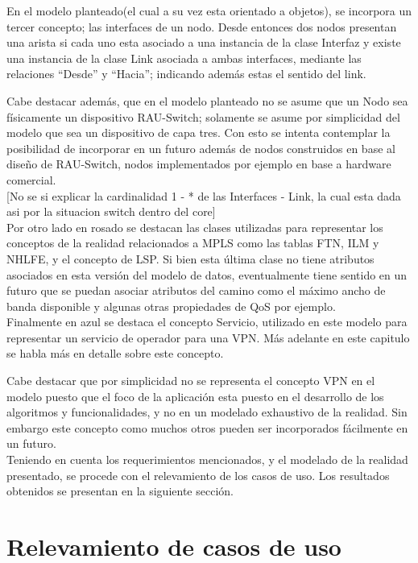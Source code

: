 En el modelo planteado(el cual a su vez esta orientado a objetos), se incorpora un tercer concepto;  las interfaces de un nodo. Desde entonces dos nodos presentan una arista si cada uno esta asociado a una instancia de la clase Interfaz y existe una instancia de la clase Link asociada a ambas interfaces, mediante las relaciones “Desde” y “Hacia”; indicando adem\'as estas el sentido del link.

Cabe destacar adem\'as, que en el modelo planteado no se asume que un Nodo sea f\'isicamente un dispositivo RAU-Switch; solamente se asume por simplicidad del modelo que sea un dispositivo de capa tres. Con esto se intenta contemplar la posibilidad de incorporar en un futuro adem\'as de nodos construidos en base al diseño de RAU-Switch, nodos implementados por ejemplo en base a hardware comercial.\\
  
[No se si explicar la cardinalidad 1 - * de las Interfaces - Link, la cual esta dada asi por la situacion switch dentro del core]\\

Por otro lado en rosado se destacan las clases utilizadas para representar los conceptos de la realidad relacionados a MPLS como las tablas FTN, ILM y NHLFE, y el concepto de LSP. Si bien esta \'ultima clase no tiene atributos asociados en esta versi\'on del modelo de datos, eventualmente tiene sentido en un futuro que se puedan asociar atributos del camino como el m\'aximo ancho de banda disponible y algunas otras propiedades de QoS por ejemplo.\\

Finalmente en azul se destaca el concepto Servicio, utilizado en este modelo para representar un servicio de operador para una VPN. M\'as adelante en este capitulo se habla m\'as en detalle sobre este concepto.

Cabe destacar que por simplicidad no se representa el concepto VPN en el modelo puesto que el foco de la aplicación esta puesto en el desarrollo de los algoritmos y funcionalidades, y no en un modelado exhaustivo de la realidad. Sin embargo este concepto como muchos otros pueden ser incorporados fácilmente en un futuro.\\

Teniendo en cuenta los requerimientos mencionados, y el modelado de la realidad presentado, se procede con el relevamiento de los casos de uso. Los resultados obtenidos se presentan en la siguiente secci\'on.

\section[Relevamiento de casos de uso]{Relevamiento de casos de uso}

